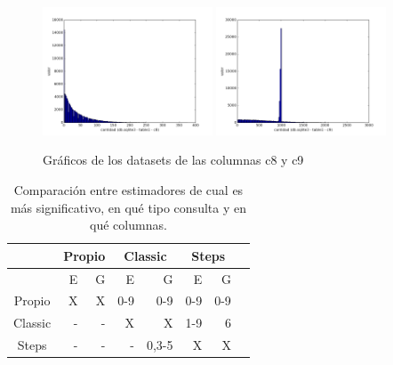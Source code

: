  
\begin{figure}[h!]
  \centering
  \includegraphics[width=0.45\textwidth]{./images/c8}
  \includegraphics[width=0.45\textwidth]{./images/c9}
  \caption{Gráficos de los datasets de las columnas c8 y c9}
 \end{figure}
 
 

\newpage

\begin{table}[h!t]
\centering %
\begin{tabular}{c rrrrrrr} %
\hline\hline %
\ &\multicolumn{2}{c}{Propio}& \multicolumn{2}{c}{Classic}& \multicolumn{2}{c}{Steps} \\ [0.5ex] 
\hline %
 & E & G & E & G & E & G &  \\  
\hline
Propio &X  &X  &0-9 &0-9 &0-9 &0-9 \\ %
\hline
Classic &-  &-  &X &X &1-9 &6 \\
\hline
Steps &-  &- &- &0,3-5 &X &X  \\[1ex] %
\hline %
\end{tabular}
\caption{Comparación entre estimadores de cual es más significativo, en qué tipo consulta y en qué columnas.} %
\label{tab:hresult}
\end{table}